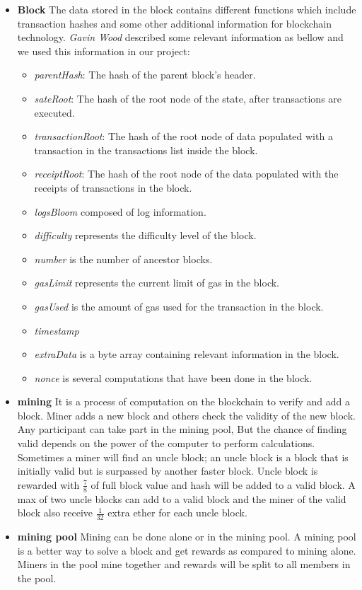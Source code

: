 \begin{itemize}
    \item \textbf{Block}
    The data stored in the block contains different functions which include transaction hashes and some other additional information for blockchain technology. \textit{Gavin Wood} described some relevant information as bellow and we used this information in our project: \\
    \begin{itemize}
        \item \textit{parentHash}: The hash of the parent block’s header.
        \item \textit{sateRoot}: The hash of the root node of the state, after transactions are executed.
        \item \textit{transactionRoot}: The hash of the root node of data populated with a transaction in the transactions list inside the block.
        \item \textit{receiptRoot}: The hash of the root node of the data populated with the receipts of transactions in the block.
        \item \textit{logsBloom} composed of log information.
        \item \textit{difficulty} represents the difficulty level of the block.
        \item \textit{number} is the number of ancestor blocks.
        \item \textit{gasLimit} represents the current limit of gas in the block.
        \item \textit{gasUsed} is the amount of gas used for the transaction in the block.
        \item \textit{timestamp}
        \item \textit{extraData} is a byte array containing relevant information in the block.
        \item \textit{nonce} is several computations that have been done in the block.
    \end{itemize}
    \item \textbf{mining}
    It is a process of computation on the blockchain to verify and add a block. Miner adds a new block and others check the validity of the new block. Any participant can take part in the mining pool, But the chance of finding valid depends on the power of the computer to perform calculations. Sometimes a miner will find an uncle block; an uncle block is a block that is initially valid but is surpassed by another faster block. Uncle block is rewarded with $\frac{7}{8}$ of full block value and hash will be added to a valid block. A max of two uncle blocks can add to a valid block and the miner of the valid block also receive $\frac{1}{32}$ extra ether for each uncle block\cite{Egbertsen}.
    \item \textbf{mining pool}
     Mining can be done alone or in the mining pool. A mining pool is a better way to solve a block and get rewards as compared to mining alone. Miners in the pool mine together and rewards will be split to all members in the pool\cite{Egbertsen}.
\end{itemize}
